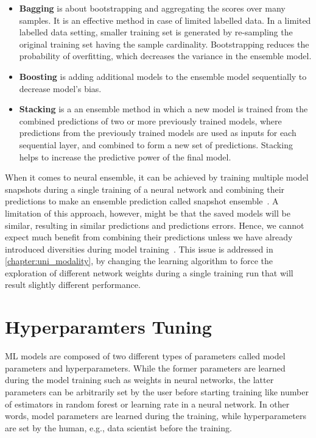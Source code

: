 \begin{itemize}[noitemsep]
    \item \textbf{Bagging} is about bootstrapping and aggregating the scores over many samples. It is an effective method in case of limited labelled data. In a limited labelled data setting, smaller training set is generated by re-sampling the original training set having the sample cardinality. Bootstrapping reduces the probability of overfitting, which decreases the variance in the ensemble model. 
    \item \textbf{Boosting} is adding additional models to the ensemble model sequentially to decrease model’s bias.
    \item \textbf{Stacking} is a an ensemble method in which a new model is trained from the combined predictions of two or more previously trained models, where predictions from the previously trained models are used as inputs for each sequential layer, and combined to form a new set of predictions. Stacking helps to increase the predictive power of the final model. 
\end{itemize}

\hspace*{3.5mm} When it comes to neural ensemble, it can be achieved by training multiple model snapshots during a single training of a neural network and combining their predictions to make an ensemble prediction called snapshot ensemble~\cite{huang2017snapshot}. A limitation of this approach, however, might be that the saved models will be similar, resulting in similar predictions and predictions errors. Hence, we cannot expect much benefit from combining their predictions unless we have already introduced diversities during model training~\cite{huang2017snapshot}. This issue is addressed in \cref{chapter:uni_modality}, by changing the learning algorithm to force the exploration of different network weights during a single training run that will result slightly different performance\cite{karimACCA2019}. 

\section{Hyperparamters Tuning}
ML models are composed of two different types of parameters called model parameters and hyperparameters. While the former parameters are learned during the model training such as weights in neural networks, the latter parameters can be arbitrarily set by the user before starting training like number of estimators in random forest or learning rate in a neural network. In other words, model parameters are learned during the training, while hyperparameters are set by the human, e.g., data scientist before the training.


